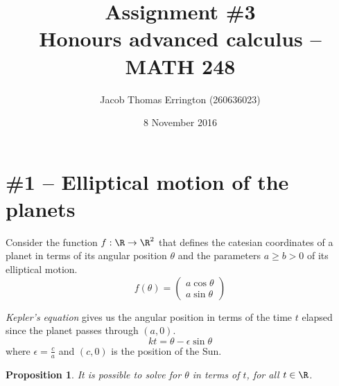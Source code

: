 \documentclass[letterpaper,11pt]{article}
\author{Jacob Thomas Errington (260636023)}
\title{Assignment \#3\\Honours advanced calculus -- MATH 248}
\date{8 November 2016}
\newtheorem{prop}{Proposition}
\newcommand{\parens}[1]{\left(#1\right)}
\begin{document}
\maketitle

\section*{\#1 -- Elliptical motion of the planets}

Consider the function $f : \R \to \R^2$ that defines the catesian coordinates
of a planet in terms of its angular position $\theta$ and the parameters
$a \geq b > 0$ of its elliptical motion.
\begin{equation*}
  f(\theta) = \parens{
    \begin{array}{l}
      a \cos \theta \\
      a \sin \theta
    \end{array}
  }
\end{equation*}

\emph{Kepler's equation} gives us the angular position in terms of the time $t$
elapsed since the planet passes through $(a, 0)$.
\begin{equation}
  kt = \theta -\epsilon \sin \theta
  \label{eq:kepler}
\end{equation}
where $\epsilon = \frac{c}{a}$ and $(c, 0)$ is the position of the Sun.

\begin{prop}
  It is possible to solve for $\theta$ in terms of $t$, for all $t \in \R$.
\end{prop}
\end{document}
